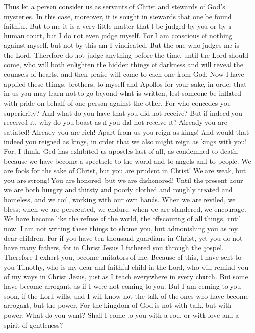 \begin{biblechapter} %
 Thus let a person consider us as servants of Christ and stewards of God’s mysteries.
\verse In this case, moreover, it is sought in stewards that one be found faithful.
\verse But to me it is a very little matter that I be judged by you or by a human court, but I do not even judge myself.
\verse For I am conscious of nothing against myself, but not by this am I vindicated. But the one who judges me is the Lord.
\verse Therefore do not judge anything before the time, until the Lord should come, who will both enlighten the hidden things of darkness and will reveal the counsels of hearts, and then praise will come to each one from God.
 Now I have applied these things, brothers, to myself and Apollos for your sake, in order that in us you may learn not to go beyond what is written, lest someone be inflated with pride on behalf of one person against the other.
\verse For who concedes you superiority? And what do you have that you did not receive? But if indeed you received it, why do you boast as if you did not receive it?
\verse Already you are satiated! Already you are rich! Apart from us you reign as kings! And would that indeed you reigned as kings, in order that we also might reign as kings with you!
\verse For, I think, God has exhibited us apostles last of all, as condemned to death, because we have become a spectacle to the world and to angels and to people.
\verse We are fools for the sake of Christ, but you are prudent in Christ! We are weak, but you are strong! You are honored, but we are dishonored!
\verse Until the present hour we are both hungry and thirsty and poorly clothed and roughly treated and homeless,
\verse and we toil, working with our own hands. When we are reviled, we bless; when we are persecuted, we endure;
\verse when we are slandered, we encourage. We have become like the refuse of the world, the offscouring of all things, until now.
 I am not writing these things to shame you, but admonishing you as my dear children.
\verse For if you have ten thousand guardians in Christ, yet you do not have many fathers, for in Christ Jesus I fathered you through the gospel.
\verse Therefore I exhort you, become imitators of me.
\verse Because of this, I have sent to you Timothy, who is my dear and faithful child in the Lord, who will remind you of my ways in Christ Jesus, just as I teach everywhere in every church.
\verse But some have become arrogant, as if I were not coming to you.
\verse But I am coming to you soon, if the Lord wills, and I will know not the talk of the ones who have become arrogant, but the power.
\verse For the kingdom of God is not with talk, but with power.
\verse What do you want? Shall I come to you with a rod, or with love and a spirit of gentleness?
\end{biblechapter}

